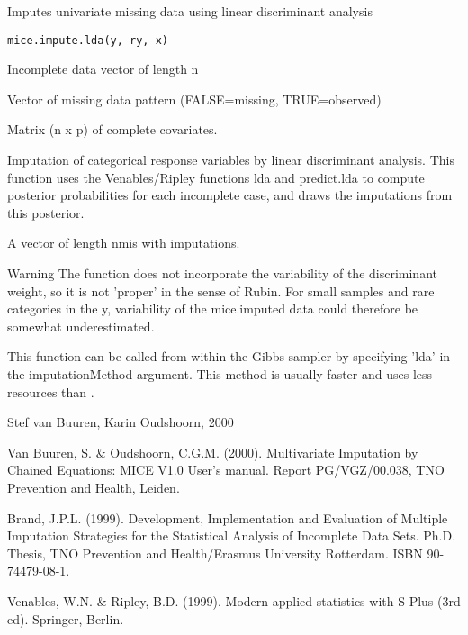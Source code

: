 \documentclass{article}
\begin{document}
\begin{Description}\relax
Imputes univariate missing data using linear discriminant analysis
\end{Description}
\begin{Usage}
\begin{verbatim}
mice.impute.lda(y, ry, x)
\end{verbatim}
\end{Usage}
\begin{Arguments}
\begin{ldescription}
\item[\code{y}] Incomplete data vector of length n
\item[\code{ry}] Vector of missing data pattern (FALSE=missing, TRUE=observed)
\item[\code{x}] Matrix (n x p) of complete covariates.
\end{ldescription}
\end{Arguments}
\begin{Details}\relax
Imputation of categorical response variables by linear discriminant
analysis. This function uses the Venables/Ripley functions
lda and predict.lda to compute posterior probabilities for
each incomplete case, and draws the imputations from this 
posterior.
\end{Details}
\begin{Value}
A vector of length nmis with imputations.
\end{Value}
\begin{Section}{Warning}
The function does not incorporate the variability of the discriminant 
weight, so it is not 'proper' in the sense of Rubin. For small samples
and rare categories in the y, variability of the mice.imputed data could 
therefore be somewhat underestimated.
\end{Section}
\begin{Note}\relax
This function can be called from within the Gibbs sampler by specifying 
'lda' in the imputationMethod argument. 
This method is usually faster and uses less resources than 
.
\end{Note}
\begin{Author}\relax
Stef van Buuren, Karin Oudshoorn, 2000
\end{Author}
\begin{References}\relax
Van Buuren, S. \& Oudshoorn, C.G.M. (2000). Multivariate Imputation by Chained Equations: 
MICE V1.0 User's manual. Report PG/VGZ/00.038, TNO Prevention and Health, Leiden.

Brand, J.P.L. (1999). Development, Implementation and Evaluation of
Multiple Imputation Strategies for the Statistical Analysis of
Incomplete Data Sets.
Ph.D. Thesis, TNO Prevention and Health/Erasmus University Rotterdam. ISBN 90-74479-08-1. 

Venables, W.N. \& Ripley, B.D. (1999). Modern applied statistics with S-Plus (3rd ed). Springer, Berlin.
\end{References}
\end{document}
